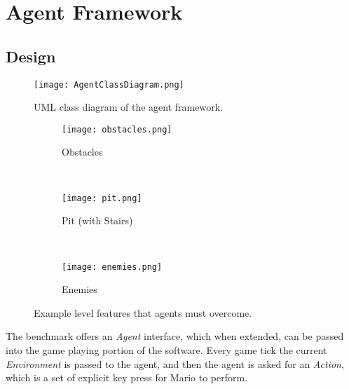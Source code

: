 
\section{Agent Framework}


\subsection{Design}
\label{subsec:agentdes}

\begin{figure}[t]
	\centering
	\texttt{[image: AgentClassDiagram.png]}
	\caption{UML class diagram of the agent framework.}
	\label{fig:aumlcd}
\end{figure}


\begin{figure}[t]
	\begin{adjustwidth}{-2cm}{-2cm}
    \centering
          \begin{subfigure}[b]{0.32\textwidth}
                  \centering
                  \texttt{[image: obstacles.png]}
                  \caption{Obstacles}  \label{fig:elemobs}
          \end{subfigure}~
          \begin{subfigure}[b]{0.32\textwidth}
                  \centering
                  \texttt{[image: pit.png]}
                  \caption{Pit (with Stairs)} \label{fig:elempit}
          \end{subfigure}~
          \begin{subfigure}[b]{0.32\textwidth}
                  \centering
                  \texttt{[image: enemies.png]}
                  \caption{Enemies} \label{fig:elemenemy}
          \end{subfigure}
	\caption{Example level features that agents must overcome.}\label{fig:lpelements}
    \end{adjustwidth}
\end{figure}

The benchmark offers an \emph{Agent} interface, which when extended, can be passed into the game playing portion of the software. Every game tick the current \emph{Environment} is passed to the agent, and then the agent is asked for an \emph{Action}, which is a set of explicit key press for Mario to perform.

